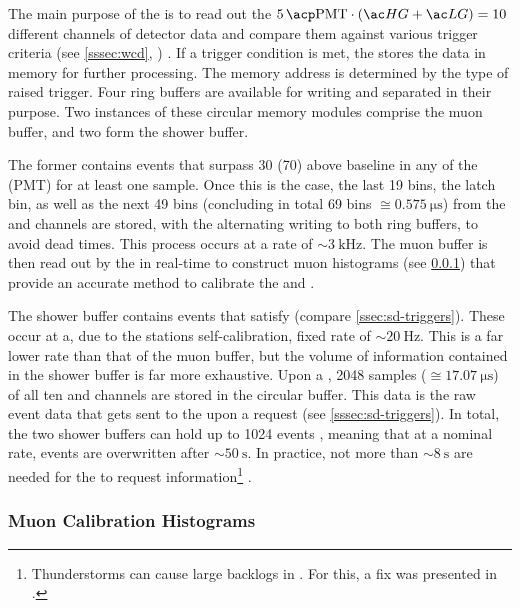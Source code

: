 The main purpose of the \FPGA is to read out the 
$\SI{5}{\PMTs} \cdot (\HG + \LG) = 10$ different channels of detector data and 
compare them against various trigger criteria (see \cref{sssec:wcd}, 
) \cite{nitzUUBV2Analog18}. If a trigger condition is met, the \FPGA 
stores the data in memory for further processing. The memory address is 
determined by the type of raised trigger. Four \FIFO ring buffers are available
for writing and separated in their purpose. Two instances of these circular 
memory modules comprise the muon buffer, and two form the shower buffer. 

The former contains events that surpass \SI{30}{\ADC} (\SI{70}{\ADC}) above 
baseline in any of the \WCD \LPMTs (\SSD PMT) for at least one sample. Once 
this is the case, the last 19 bins, the latch bin, as well as the next 49 bins 
(concluding in total 69 bins $\cong\SI{0.575}{\micro\second}$) from the \WCD 
and \SSD \HG channels are stored, with the \FPGA alternating writing to both 
ring buffers, to avoid dead times. This process occurs at a rate of 
$\sim\SI{3}{\kilo\Hz}$. The muon buffer is then read out by the \CPU in 
real-time to construct muon histograms (see \cref{sssec:muon-histograms}) that 
provide an accurate method to calibrate the \WCD and \SSD.

The shower buffer contains events that satisfy \TTWOs (compare 
\cref{ssec:sd-triggers}). These occur at a, due to the stations 
self-calibration, fixed rate of $\sim\SI{20}{\hertz}$. This is a far lower rate
than that of the muon buffer, but the volume of information contained in the 
shower buffer is far more exhaustive. Upon a \TTWO, 2048 samples 
($\cong\SI{17.07}{\micro\second}$) of all ten \HG and \LG channels are stored 
in the circular buffer. This data is the raw event data that gets sent to the 
\CDAS upon a \TTHREE request (see \cref{sssec:sd-triggers}). In total, the two 
shower buffers can hold up to 1024 \TTWO events 
\cite{wainbergDigitalElectronicsPierre2014}, meaning that at a nominal \TTWO
rate, events are overwritten after $\sim\SI{50}{\second}$. In practice, not 
more than $\sim\SI{8}{\second}$ are needed for the \CDAS to request \TTWO 
information\footnote{Thunderstorms can cause large backlogs in \TTHREEs. For 
this, a fix was presented in .}
\cite{collaborationPierreAugerObservatory2016}.

\subsubsection{Muon Calibration Histograms}
\label{sssec:muon-histograms}

